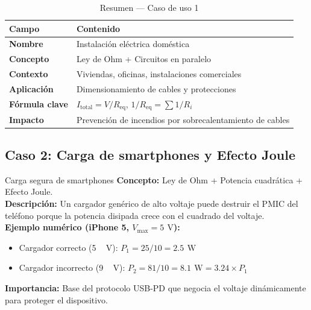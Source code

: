 \documentclass[12pt, a4paper]{article}
\newcommand{\V}{\,\si{\volt}}
\newcommand{\W}{\,\si{\watt}}
\newcommand{\Req}{R_{\mathrm{eq}}}
\begin{document}
\vspace{4pt}
\begin{table}[H]
\centering\small
\caption{Resumen --- Caso de uso 1}
\begin{tabularx}{0.85\linewidth}{>{\bfseries}lX}
\toprule
Campo & Contenido \\ \midrule
Nombre       & Instalación eléctrica doméstica \\
Concepto     & Ley de Ohm + Circuitos en paralelo \\
Contexto     & Viviendas, oficinas, instalaciones comerciales \\
Aplicación   & Dimensionamiento de cables y protecciones \\
Fórmula clave & $I_{\mathrm{total}} = V/\Req$,\;\; $1/\Req = \sum 1/R_i$ \\
Impacto      & Prevención de incendios por sobrecalentamiento de cables \\ \bottomrule
\end{tabularx}
\end{table}

\subsection{Caso 2: Carga de smartphones y Efecto Joule}

\begin{casodeuso}{Carga segura de smartphones}
\textbf{Concepto:} Ley de Ohm + Potencia cuadrática + Efecto Joule.\\[4pt]
\textbf{Descripción:} Un cargador genérico de alto voltaje puede destruir
el PMIC del teléfono porque la potencia disipada crece con el cuadrado del
voltaje.\\[4pt]
\textbf{Ejemplo numérico (iPhone 5, $V_{\max} = \SI{5}{\V}$):}
\begin{itemize}
  \item Cargador correcto (\SI{5}{\V}): $P_1 = 25/10 = \SI{2.5}{\W}$
  \item Cargador incorrecto (\SI{9}{\V}): $P_2 = 81/10 = \SI{8.1}{\W} = 3.24\times P_1$
\end{itemize}
\textbf{Importancia:} Base del protocolo USB-PD que negocia el voltaje
dinámicamente para proteger el dispositivo.
\end{casodeuso}
\end{document}

